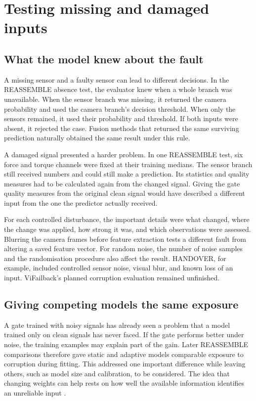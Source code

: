 \section{Testing missing and damaged inputs}
\label{sec:ch4-robustness}

\subsection{What the model knew about the fault}

A missing sensor and a faulty sensor can lead to different decisions. In the REASSEMBLE absence test, the evaluator knew when a whole branch was unavailable. When the sensor branch was missing, it returned the camera probability and used the camera branch’s decision threshold. When only the sensors remained, it used their probability and threshold. If both inputs were absent, it rejected the case. Fusion methods that returned the same surviving prediction naturally obtained the same result under this rule.

A damaged signal presented a harder problem. In one REASSEMBLE test, six force and torque channels were fixed at their training medians. The sensor branch still received numbers and could still make a prediction. Its statistics and quality measures had to be calculated again from the changed signal. Giving the gate quality measures from the original clean signal would have described a different input from the one the predictor actually received.

For each controlled disturbance, the important details were what changed, where the change was applied, how strong it was, and which observations were assessed. Blurring the camera frames before feature extraction tests a different fault from altering a saved feature vector. For random noise, the number of noise samples and the randomisation procedure also affect the result. HANDOVER, for example, included controlled sensor noise, visual blur, and known loss of an input. ViFailback’s planned corruption evaluation remained unfinished.

\subsection{Giving competing models the same exposure}

A gate trained with noisy signals has already seen a problem that a model trained only on clean signals has never faced. If the gate performs better under noise, the training examples may explain part of the gain. Later REASSEMBLE comparisons therefore gave static and adaptive models comparable exposure to corruption during fitting. This addressed one important difference while leaving others, such as model size and calibration, to be considered. The idea that changing weights can help rests on how well the available information identifies an unreliable input \parencite{Zhang2023QMF}.

